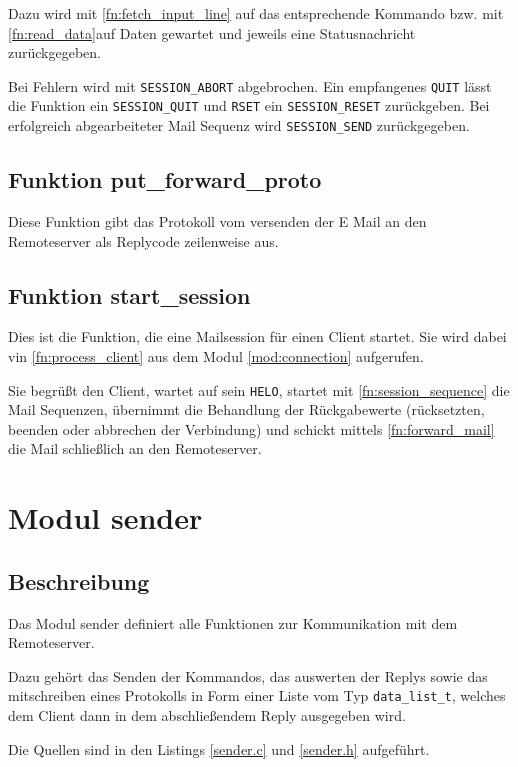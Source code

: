 \documentclass[pdftex,final,a4paper,10pt,notitlepage,halfparskip]{scrreprt}
\begin{document}
Dazu wird mit \ref{fn:fetch_input_line} auf das entsprechende Kommando bzw. mit \ref{fn:read_data}auf Daten gewartet und jeweils eine Statusnachricht zurückgegeben.

Bei Fehlern wird mit \texttt{SESSION\_ABORT} abgebrochen. Ein empfangenes \texttt{QUIT} lässt die Funktion ein \texttt{SESSION\_QUIT} und \texttt{RSET} ein \texttt{SESSION\_RESET} zurückgeben. Bei erfolgreich abgearbeiteter Mail Sequenz wird \texttt{SESSION\_SEND} zurückgegeben.

\subsection{Funktion put\_forward\_proto}\label{fn:put_forward_proto}
Diese Funktion gibt das Protokoll vom versenden der E Mail an den Remoteserver als Replycode zeilenweise aus.


\subsection{Funktion start\_session}\label{fn:start_session}
Dies ist die Funktion, die eine Mailsession für einen Client startet. Sie wird dabei vin \ref{fn:process_client} aus dem Modul \ref{mod:connection} aufgerufen.

Sie begrüßt den Client, wartet auf sein \texttt{HELO}, startet mit \ref{fn:session_sequence} die Mail Sequenzen, übernimmt die Behandlung der Rückgabewerte (rücksetzten, beenden oder abbrechen der Verbindung) und schickt mittels \ref{fn:forward_mail} die Mail schließlich an den Remoteserver.



\section{Modul sender}\label{mod:sender}
\subsection{Beschreibung}
Das Modul sender definiert alle Funktionen zur Kommunikation mit dem Remoteserver.

Dazu gehört das Senden der Kommandos, das auswerten der Replys sowie das mitschreiben eines Protokolls in Form einer Liste vom Typ \texttt{data\_list\_t}, welches dem Client dann in dem abschließendem Reply ausgegeben wird.

Die Quellen sind in den Listings \ref{sender.c} und \ref{sender.h} aufgeführt.
\end{document}
